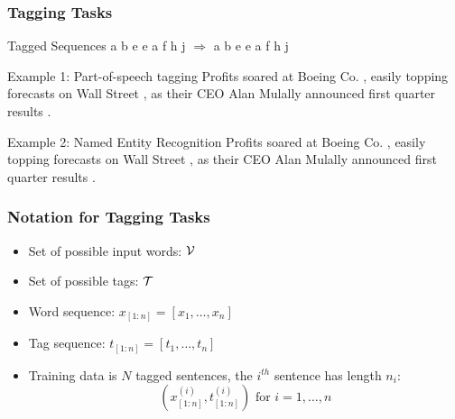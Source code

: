 \begin{frame}
\frametitle{Tagging Tasks}
\begin{block}{Tagged Sequences}
a b e e a f h j $\Rightarrow$ a b e e a f h j
\end{block}
\pause
\begin{alertblock}{Example 1: Part-of-speech tagging}
Profits soared at Boeing Co. ,\postag{,} easily topping forecasts on Wall Street ,\postag{,} as their CEO Alan Mulally announced first quarter results .
\end{alertblock}
\pause
\begin{alertblock}{Example 2: Named Entity Recognition}
Profits soared at Boeing Co. , easily topping forecasts on Wall Street , as their CEO Alan Mulally announced first quarter results .
\end{alertblock}
\end{frame}


\begin{frame}
\frametitle{Notation for Tagging Tasks}
\begin{itemize}[<+->]
\item Set of possible input words: ${\cal V}$
\item Set of possible tags: ${\cal T}$
\item Word sequence: $x_{[1:n]} = [x_1, \ldots, x_n]$
\item Tag sequence: $t_{[1:n]} = [t_1, \ldots, t_n]$
\item Training data is $N$ tagged sentences, the $i^{th}$ sentence has length $n_i$:
\[ (x_{[1:n]}^{(i)}, t_{[1:n]}^{(i)}) \textrm{ for } i = 1, \ldots, n \]
\end{itemize}
\end{frame}

